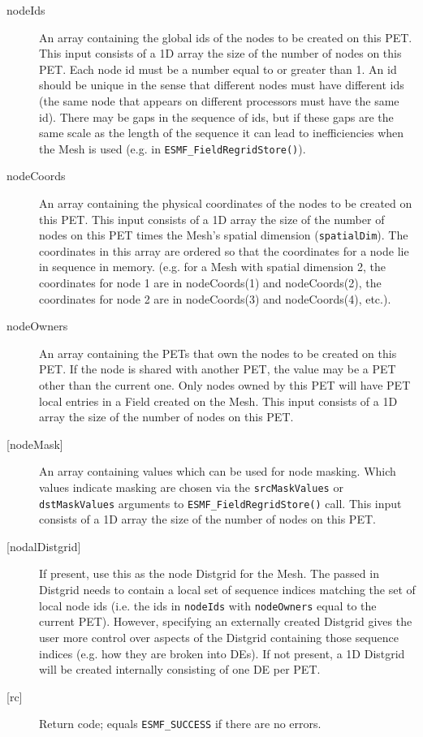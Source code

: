      \begin{description}
     \item [nodeIds]
           An array containing the global ids of the nodes to be created on this PET.
           This input consists of a 1D array the size of the number of nodes on this PET.
            Each node id must be a number equal to or greater than 1. An id should be
            unique in the sense that different nodes must have different ids (the same node
            that appears on different processors must have the same id). There may be gaps in the sequence
            of ids, but if these gaps are the same scale as the length of the sequence it can lead to
            inefficiencies when the Mesh is used (e.g. in {\tt ESMF\_FieldRegridStore()}).
     \item[nodeCoords]
            An array containing the physical coordinates of the nodes to be created on this
            PET. This input consists of a 1D array the size of the number of nodes on this PET times the Mesh's
            spatial dimension ({\tt spatialDim}). The coordinates in this array are ordered
            so that the coordinates for a node lie in sequence in memory. (e.g. for a
            Mesh with spatial dimension 2, the coordinates for node 1 are in nodeCoords(1) and
            nodeCoords(2), the coordinates for node 2 are in nodeCoords(3) and nodeCoords(4),
            etc.).
     \item[nodeOwners]
           An array containing the PETs that own the nodes to be created on this PET.
           If the node is shared with another PET, the value
           may be a PET other than the current one. Only nodes owned by this PET
           will have PET local entries in a Field created on the Mesh. This input consists of
           a 1D array the size of the number of nodes on this PET.
     \item [{[nodeMask]}]
            An array containing values which can be used for node masking. Which values indicate
            masking are chosen via the {\tt srcMaskValues} or {\tt dstMaskValues} arguments to
            {\tt ESMF\_FieldRegridStore()} call. This input consists of a 1D array the
            size of the number of nodes on this PET.
     \item [{[nodalDistgrid]}]
            If present, use this as the node Distgrid for the Mesh.
            The passed in Distgrid
            needs to contain a local set of sequence indices matching the set of local node ids (i.e. the ids in
            {\tt nodeIds} with {\tt nodeOwners} equal to the current PET).
            However, specifying an externally created Distgrid gives the user more control over aspects of
            the Distgrid containing those sequence indices (e.g. how they are broken into DEs).
            If not present, a 1D Distgrid will be created internally consisting of one DE per PET.
     \item [{[rc]}]
           Return code; equals {\tt ESMF\_SUCCESS} if there are no errors.
     \end{description}
   
